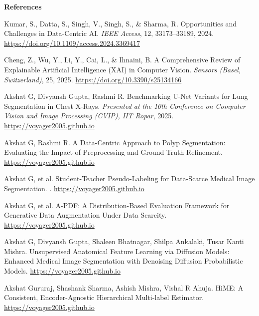 \documentclass[12pt]{article}
\begin{document}
{\footnotesize
\textbf{References}
\begin{enumerate}[leftmargin=1.3em, itemsep=1pt, label={[\arabic*]}]
\item \label{ref1} Kumar, S., Datta, S., Singh, V., Singh, S., \& Sharma, R. Opportunities and Challenges in Data-Centric AI. \emph{IEEE Access}, 12, 33173--33189, 2024. \url{https://doi.org/10.1109/access.2024.3369417}
\item \label{ref2} Cheng, Z., Wu, Y., Li, Y., Cai, L., \& Ihnaini, B. A Comprehensive Review of Explainable Artificial Intelligence (XAI) in Computer Vision. \emph{Sensors (Basel, Switzerland)}, 25, 2025. \url{https://doi.org/10.3390/s25134166}
\item \label{ref3} Akshat G, Divyansh Gupta, Rashmi R. Benchmarking U-Net Variants for Lung Segmentation in Chest X-Rays. \emph{Presented at the 10th Conference on Computer Vision and Image Processing (CVIP), IIT Ropar}, 2025. \url{https://voyager2005.github.io}
\item \label{ref4} Akshat G, Rashmi R. A Data-Centric Approach to Polyp Segmentation: Evaluating the Impact of Preprocessing and Ground-Truth Refinement. \url{https://voyager2005.github.io}
\item \label{ref5} Akshat G, et al. Student-Teacher Pseudo-Labeling for Data-Scarce Medical Image Segmentation. \emph{}. \url{https://voyager2005.github.io}
\item \label{ref6} Akshat G, et al. A-PDF: A Distribution-Based Evaluation Framework for Generative Data Augmentation Under Data Scarcity. \url{https://voyager2005.github.io}
\item \label{ref7} Akshat G, Divyansh Gupta, Shaleen Bhatnagar, Shilpa Ankalaki, Tusar Kanti Mishra. Unsupervised Anatomical Feature Learning via Diffusion Models: Enhanced Medical Image Segmentation with Denoising Diffusion Probabilistic Models. \url{https://voyager2005.github.io}
\item \label{ref8} Akshat Gururaj, Shashank Sharma, Ashish Mishra, Vishal R Ahuja. HiME: A Consistent, Encoder-Agnostic Hierarchical Multi-label Estimator. \url{https://voyager2005.github.io}
\end{enumerate}
}
\end{document}
